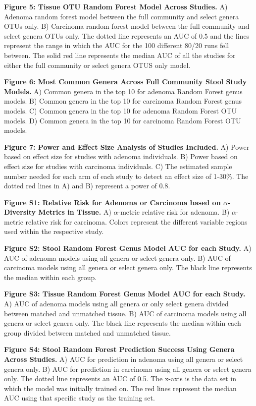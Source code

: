 \documentclass[12pt,]{article}
\begin{document}
\textbf{Figure 5: Tissue OTU Random Forest Model Across Studies.} A)
Adenoma random forest model between the full community and select genera
OTUs only. B) Carcinoma random forest model between the full community
and select genera OTUs only. The dotted line represents an AUC of 0.5
and the lines represent the range in which the AUC for the 100 different
80/20 runs fell between. The solid red line represents the median AUC of
all the studies for either the full community or select genera OTUS only
model.

\textbf{Figure 6: Most Common Genera Across Full Community Stool Study
Models.} A) Common genera in the top 10 for adenoma Random Forest genus
models. B) Common genera in the top 10 for carcinoma Random Forest genus
models. C) Common genera in the top 10 for adenoma Random Forest OTU
models. D) Common genera in the top 10 for carcinoma Random Forest OTU
models.

\textbf{Figure 7: Power and Effect Size Analysis of Studies Included.}
A) Power based on effect size for studies with adenoma individuals. B)
Power based on effect size for studies with carcinoma individuals. C)
The estimated sample number needed for each arm of each study to detect
an effect size of 1-30\%. The dotted red lines in A) and B) represent a
power of 0.8.

\newpage

\textbf{Figure S1: Relative Risk for Adenoma or Carcinoma based on
\(\alpha\)-Diversity Metrics in Tissue.} A) \(\alpha\)-metric relative
risk for adenoma. B) \(\alpha\)-metric relative risk for carcinoma.
Colors represent the different variable regions used within the
respective study.

\textbf{Figure S2: Stool Random Forest Genus Model AUC for each Study.}
A) AUC of adenoma models using all genera or select genera only. B) AUC
of carcinoma models using all genera or select genera only. The black
line represents the median within each group.

\textbf{Figure S3: Tissue Random Forest Genus Model AUC for each Study.}
A) AUC of adenoma models using all genera or only select genera divided
between matched and unmatched tissue. B) AUC of carcinoma models using
all genera or select genera only. The black line represents the median
within each group divided between matched and unmatched tissue.

\textbf{Figure S4: Stool Random Forest Prediction Success Using Genera
Across Studies.} A) AUC for prediction in adenoma using all genera or
select genera only. B) AUC for prediction in carcinoma using all genera
or select genera only. The dotted line represents an AUC of 0.5. The
x-axis is the data set in which the model was initially trained on. The
red lines represent the median AUC using that specific study as the
training set.
\end{document}
